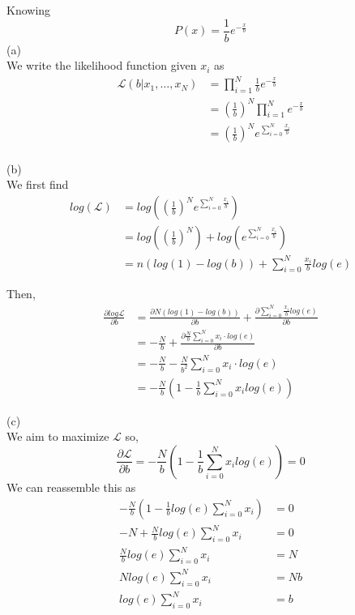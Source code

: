 \documentclass{article}
\begin{document}
Knowing 
\begin{equation*}
P(x) = \frac{1}{b}e^{-\frac{x}{b}}
\end{equation*}
(a)\\
We write the likelihood function given \(x_i\) as
\begin{align*}
\mathcal{L}(b|x_1,\hdots,x_N) 
&= \prod_{i = 1}^N \frac{1}{b}e^{-\frac{x}{b}}\\
&= \left(\frac{1}{b}\right)^N \prod_{i = 1}^N e^{-\frac{x}{b}}\\
&= \left(\frac{1}{b}\right)^N e^{\sum_{i=0}^N \frac{x_i}{b}}
\end{align*}
\\
(b)\\
We first find
\begin{align*}
log(\mathcal{L}) 
&= log\left(\left(\frac{1}{b}\right)^N e^{\sum_{i=0}^N \frac{x_i}{b}}\right)\\
&= log\left(\left(\frac{1}{b}\right)^N\right) + log\left(e^{\sum_{i=0}^N \frac{x_i}{b}}\right)\\
&= n(log(1) - log(b)) + \sum_{i=0}^N \frac{x_i}{b}log(e)
\end{align*}

Then,
\begin{align*}
\frac{\partial log \mathcal{L}}{\partial b}
&= \frac{\partial N(log(1) - log(b))}{\partial b} + \frac{\partial \sum_{i=0}^N \frac{x_i}{b}log(e)}{\partial b}\\
&= -\frac{N}{b} + \frac{\partial \frac{N}{b}\sum_{i=0}^N x_i\cdot log(e)}{\partial b}\\
&= -\frac{N}{b} - \frac{N}{b^2}\sum_{i=0}^N x_i\cdot log(e)\\
&= -\frac{N}{b}\left(1-\frac{1}{b}\sum_{i=0}^N x_i log(e)\right)
\end{align*}

(c)\\
We aim to maximize \(\mathcal{L}\) so,
\begin{equation*}
\frac{\partial \mathcal{L}}{\partial b} = -\frac{N}{b}\left(1-\frac{1}{b}\sum_{i=0}^N x_i log(e)\right) = 0
\end{equation*}
We can reassemble this as
\begin{align*}
-\frac{N}{b}\left(1-\frac{1}{b}log(e)\sum_{i=0}^N x_i\right)
&= 0\\
-N + \frac{N}{b}log(e)\sum_{i=0}^N x_i &= 0\\
\frac{N}{b}log(e)\sum_{i=0}^N x_i &= N\\
Nlog(e)\sum_{i=0}^N x_i &= Nb\\
log(e)\sum_{i=0}^N x_i &= b
\end{align*}
\end{document}
